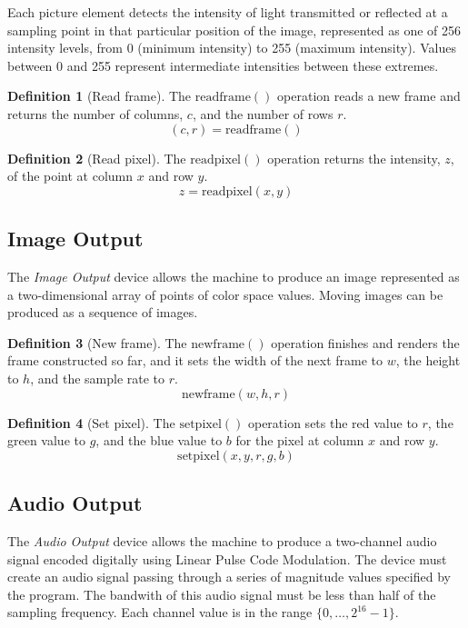 \documentclass[a4paper,10pt]{article}
\newcommand{\range}[2]{\{#1,\ldots,#2\}}
\newcommand{\SetPixel}[1]{\mathrm{setpixel}(#1)}
\newcommand{\NewFrame}[1]{\mathrm{newframe}(#1)}
\newcommand{\ReadPixel}[1]{\mathrm{readpixel}(#1)}
\newcommand{\ReadFrame}[1]{\mathrm{readframe}(#1)}
\theoremstyle{definition}
\newtheorem{definition}{Definition}
\begin{document}
Each picture element detects the intensity of light transmitted or reflected at a sampling point in that particular position of the image, represented as one of 256 intensity levels, from 0 (minimum intensity) to 255 (maximum intensity).
Values between 0 and 255 represent intermediate intensities between these extremes.

\begin{definition}[Read frame]
  The $\ReadFrame{}$ operation reads a new frame and returns the number of columns, $c$, and the number of rows $r$.
  \[ (c, r) = \ReadFrame{} \]
\end{definition}

\begin{definition}[Read pixel]
  The $\ReadPixel{}$ operation returns the intensity, $z$, of the point at column $x$ and row $y$.
  \[ z = \ReadPixel{x, y} \]
\end{definition}

\subsection{Image Output}
\label{sec:image-output}

The \emph{Image Output} device allows the machine to produce an image represented as a two-dimensional array of points of color space values.
Moving images can be produced as a sequence of images.

\begin{definition}[New frame]
  The $\NewFrame{}$ operation finishes and renders the frame constructed so far, and it sets the width of the next frame to $w$, the height to $h$, and the sample rate to $r$.
  \[ \NewFrame{w, h, r} \]
\end{definition}

\begin{definition}[Set pixel]
  The $\SetPixel{}$ operation sets the red value to $r$, the green value to $g$, and the blue value to $b$ for the pixel at column $x$ and row $y$.
  \[ \SetPixel{x, y, r, g, b} \]
\end{definition}

\subsection{Audio Output}
\label{sec:audio-output}

The \emph{Audio Output} device allows the machine to produce a two-channel audio signal encoded digitally using Linear Pulse Code Modulation.
The device must create an audio signal passing through a series of magnitude values specified by the program.
The bandwith of this audio signal must be less than half of the sampling frequency.
Each channel value is in the range $\range{0}{2^{16}-1}$.
\end{document}
